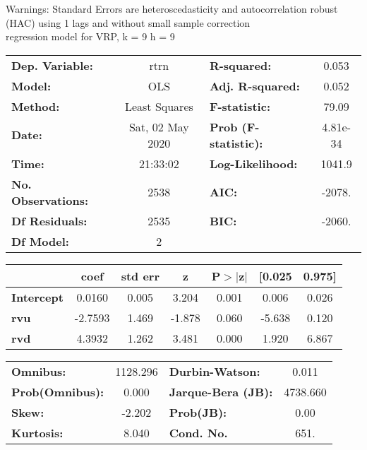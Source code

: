 Warnings: \newline
 [1] Standard Errors are heteroscedasticity and autocorrelation robust (HAC) using 1 lags and without small sample correction\\ 

regression model for VRP, k = 9 h = 9\begin{center}
\begin{tabular}{lclc}
\toprule
\textbf{Dep. Variable:}    &       rtrn       & \textbf{  R-squared:         } &     0.053   \\
\textbf{Model:}            &       OLS        & \textbf{  Adj. R-squared:    } &     0.052   \\
\textbf{Method:}           &  Least Squares   & \textbf{  F-statistic:       } &     79.09   \\
\textbf{Date:}             & Sat, 02 May 2020 & \textbf{  Prob (F-statistic):} &  4.81e-34   \\
\textbf{Time:}             &     21:33:02     & \textbf{  Log-Likelihood:    } &    1041.9   \\
\textbf{No. Observations:} &        2538      & \textbf{  AIC:               } &    -2078.   \\
\textbf{Df Residuals:}     &        2535      & \textbf{  BIC:               } &    -2060.   \\
\textbf{Df Model:}         &           2      & \textbf{                     } &             \\
\bottomrule
\end{tabular}
\begin{tabular}{lcccccc}
                   & \textbf{coef} & \textbf{std err} & \textbf{z} & \textbf{P$> |$z$|$} & \textbf{[0.025} & \textbf{0.975]}  \\
\midrule
\textbf{Intercept} &       0.0160  &        0.005     &     3.204  &         0.001        &        0.006    &        0.026     \\
\textbf{rvu}       &      -2.7593  &        1.469     &    -1.878  &         0.060        &       -5.638    &        0.120     \\
\textbf{rvd}       &       4.3932  &        1.262     &     3.481  &         0.000        &        1.920    &        6.867     \\
\bottomrule
\end{tabular}
\begin{tabular}{lclc}
\textbf{Omnibus:}       & 1128.296 & \textbf{  Durbin-Watson:     } &    0.011  \\
\textbf{Prob(Omnibus):} &   0.000  & \textbf{  Jarque-Bera (JB):  } & 4738.660  \\
\textbf{Skew:}          &  -2.202  & \textbf{  Prob(JB):          } &     0.00  \\
\textbf{Kurtosis:}      &   8.040  & \textbf{  Cond. No.          } &     651.  \\
\bottomrule
\end{tabular}
\end{center}

